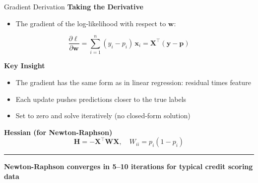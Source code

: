 \documentclass[8pt,aspectratio=169]{beamer}
\newcommand{\bottomnote}[1]{%
\vfill
\vspace{-2mm}
\textcolor{mllavender2}{\rule{\textwidth}{0.4pt}}
\vspace{1mm}
\footnotesize
\textbf{#1}
}
\begin{document}
\begin{frame}[t]{Gradient Derivation}
\textbf{Taking the Derivative}
\begin{itemize}
  \item The gradient of the log-likelihood with respect to $\mathbf{w}$:
\end{itemize}
\begin{equation}
\frac{\partial \ell}{\partial \mathbf{w}} = \sum_{i=1}^{n}(y_i - p_i)\,\mathbf{x}_i = \mathbf{X}^\top(\mathbf{y} - \mathbf{p})
\end{equation}

\vspace{0.3em}
\textbf{Key Insight}
\begin{itemize}
  \item The gradient has the same form as in linear regression: residual times feature
  \item Each update pushes predictions closer to the true labels
  \item Set to zero and solve iteratively (no closed-form solution)
\end{itemize}

\vspace{0.3em}
\textbf{Hessian (for Newton-Raphson)}
\begin{equation}
\mathbf{H} = -\mathbf{X}^\top \mathbf{W} \mathbf{X}, \quad W_{ii} = p_i(1-p_i)
\end{equation}
\bottomnote{Newton-Raphson converges in 5--10 iterations for typical credit scoring data}
\end{frame}
\end{document}
